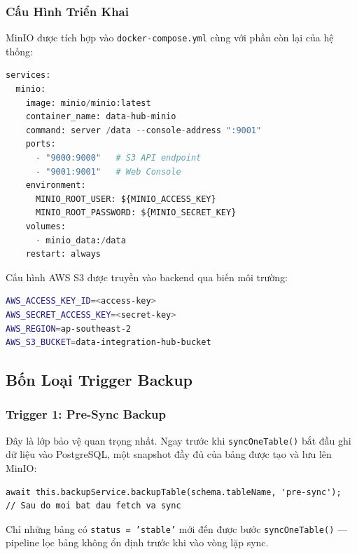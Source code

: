 \subsubsection{Cấu Hình Triển Khai}

MinIO được tích hợp vào \texttt{docker-compose.yml} cùng với phần còn lại của
hệ thống:

\begin{lstlisting}[language=python, caption={Cấu hình MinIO trong docker-compose.yml}]
services:
  minio:
    image: minio/minio:latest
    container_name: data-hub-minio
    command: server /data --console-address ":9001"
    ports:
      - "9000:9000"   # S3 API endpoint
      - "9001:9001"   # Web Console
    environment:
      MINIO_ROOT_USER: ${MINIO_ACCESS_KEY}
      MINIO_ROOT_PASSWORD: ${MINIO_SECRET_KEY}
    volumes:
      - minio_data:/data
    restart: always
\end{lstlisting}

Cấu hình AWS S3 được truyền vào backend qua biến môi trường:

\begin{lstlisting}[language=bash, caption={Biến môi trường AWS S3}]
AWS_ACCESS_KEY_ID=<access-key>
AWS_SECRET_ACCESS_KEY=<secret-key>
AWS_REGION=ap-southeast-2
AWS_S3_BUCKET=data-integration-hub-bucket
\end{lstlisting}

\subsection{Bốn Loại Trigger Backup}

\subsubsection{Trigger 1: Pre-Sync Backup}

Đây là lớp bảo vệ quan trọng nhất. Ngay trước khi \texttt{syncOneTable()}
bắt đầu ghi dữ liệu vào PostgreSQL, một snapshot đầy đủ của bảng được tạo
và lưu lên MinIO:

\begin{lstlisting}[caption={Pre-sync backup trong syncOneTable()}]
await this.backupService.backupTable(schema.tableName, 'pre-sync');
// Sau do moi bat dau fetch va sync
\end{lstlisting}

Chỉ những bảng có \texttt{status = 'stable'} mới đến được bước
\texttt{syncOneTable()} — pipeline lọc bảng không ổn định trước khi vào vòng
lặp sync.

